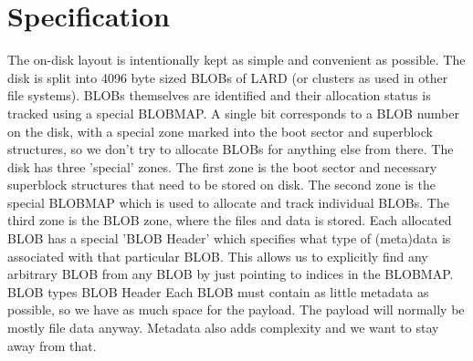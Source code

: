 \documentclass{article}
\begin{document}
\section{Specification}
The on-disk layout is intentionally kept as simple and convenient as possible.
The disk is split into 4096 byte sized BLOBs of LARD (or clusters as used in other file systems).
BLOBs themselves are identified and their allocation status is tracked using a special BLOBMAP.
A single bit corresponds to a BLOB number on the disk, with a special zone marked into the boot sector and superblock structures, so we don't
try to allocate BLOBs for anything else from there.
\newline
The disk has three 'special' zones.
The first zone is the boot sector and necessary superblock structures that need to be stored on disk.
The second zone is the special BLOBMAP which is used to allocate and track individual BLOBs.
The third zone is the BLOB zone, where the files and data is stored.
\newline
Each allocated BLOB has a special 'BLOB Header' which specifies what type of (meta)data is associated with that particular BLOB.
This allows us to explicitly find any arbitrary BLOB from any BLOB by just pointing to indices in the BLOBMAP.
\vspace{0.15cm}
\newline
{\large BLOB types}
\newline
{}
\vspace{0.15cm}
\newline
{\large BLOB Header}
\vspace{0.15cm}
\newline
{}
\vspace{0.15cm}
\newline
Each BLOB must contain as little metadata as possible, so we have as much space for the payload.
The payload will normally be mostly file data anyway.
Metadata also adds complexity and we want to stay away from that.
\end{document}
